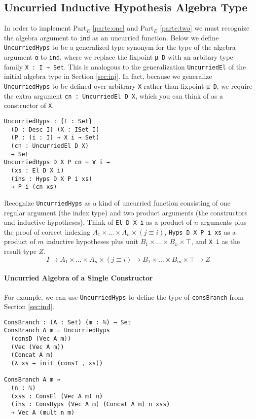 \documentclass[preprint,nonatbib]{sigplanconf}
\newcommand{\refsec}[1]{Section \ref{sec:#1}}
\newcommand{\refparte}[1]{Part$_E$ \ref{parte:#1}}
\begin{document}
\subsection{Uncurried Inductive Hypothesis Algebra Type}

In order to implement
\refparte{one} and \refparte{two} we must recognize the algebra
argument to {\tt ind} as an uncurried function.
Below we define {\tt UncurriedHyps} to be a generalized type synonym
for the type of the algebra argument {\tt α} to {\tt ind}, where we
replace the fixpoint
{\tt μ D} with an arbitary type family {\tt X : I → Set}. This is
analogous to the generalization {\tt UncurriedEl} of the initial
algebra type in \refsec{inj}. In fact, because we generalize
{\tt UncurriedHyps} to be defined over arbitrary {\tt X} rather than
fixpoint {\tt μ D}, we require the extra argument
{\tt cn : UncurriedEl D X}, which you can think of as a
constructor of {\tt X}.

\begin{verbatim}
UncurriedHyps : {I : Set}
  (D : Desc I) (X : ISet I)
  (P : (i : I) → X i → Set)
  (cn : UncurriedEl D X)
  → Set
UncurriedHyps D X P cn = ∀ i →
  (xs : El D X i)
  (ihs : Hyps D X P i xs)
  → P i (cn xs)
\end{verbatim}

Recognize {\tt UncurriedHyps} as a kind of uncurried function
consisting of one regular argument (the index type) and two product
arguments (the constructors and inductive hypotheses). 
Think of
{\tt El D X i} as a product of $n$ arguments plus the proof of correct
indexing $A_1 × ... × A_n × (j≡i)$, {\tt Hyps D X P i xs} as a
product of $m$ inductive hypotheses plus unit $B_1 × ... × B_n × ⊤$,
and {\tt X i} as the result type $Z$.
\[
I → A_1 × ... × A_n × (j ≡ i) → B_1 × ... × B_m × ⊤ → Z
\]

\paragraph{Uncurried Algebra of a Single Constructor}

For example, we can use {\tt UncurriedHyps} to define the type of
{\tt consBranch} from \refsec{ind}.

\begin{verbatim}
ConsBranch : (A : Set) (m : ℕ) → Set
ConsBranch A m = UncurriedHyps
  (consD (Vec A m))
  (Vec (Vec A m))
  (Concat A m)
  (λ xs → init (consT , xs))

ConsBranch A m ⇝
  (n : ℕ)
  (xss : ConsEl (Vec A m) n)
  (ihs : ConsHyps (Vec A m) (Concat A m) n xss)
  → Vec A (mult n m)
\end{verbatim}
\end{document}
